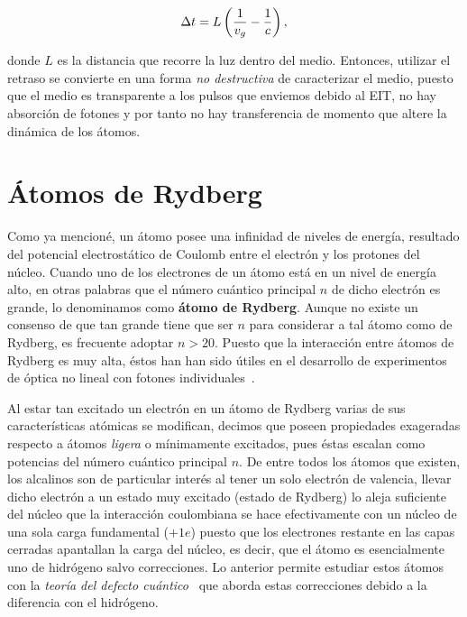 \begin{equation}
\label{ec:retraso}
\Delta t=L\left(\dfrac{1}{v_{g}}-\dfrac{1}{c}\right),
\end{equation}

donde $L$ es la distancia que recorre la luz dentro del medio. Entonces, utilizar el retraso se convierte en una forma \emph{no destructiva} de caracterizar el medio, puesto que el medio es transparente a los pulsos que enviemos debido al EIT, no hay absorción de fotones y por tanto no hay transferencia de momento que altere la dinámica de los átomos.

\section{\label{sec:atomosRydberg}Átomos de Rydberg}

Como ya mencioné, un átomo posee una infinidad de niveles de energía, resultado del potencial electrostático de Coulomb entre el electrón y los protones del núcleo. Cuando uno de los electrones de un átomo está en un nivel de energía alto, en otras palabras que el número cuántico principal $n$ de dicho electrón es grande, lo denominamos como \textbf{átomo de Rydberg}. Aunque no existe un consenso de que tan grande tiene que ser $n$ para considerar a tal átomo como de Rydberg, es frecuente adoptar $n>20$. Puesto que la interacción entre átomos de Rydberg es muy alta, éstos han han sido útiles en el desarrollo de experimentos de óptica no lineal con fotones individuales~\cite{peyronel,gorniaczyk,chang}.

\p Al estar tan excitado un electrón en un átomo de Rydberg varias de sus características atómicas se modifican, decimos que poseen propiedades exageradas respecto a átomos \emph{ligera} o mínimamente excitados, pues éstas escalan como potencias del número cuántico principal $n$. De entre todos los átomos que existen, los alcalinos son de particular interés al tener un solo electrón de valencia, llevar dicho electrón a un estado muy excitado (estado de Rydberg) lo aleja suficiente del núcleo que la interacción coulombiana se hace efectivamente con un núcleo de una sola carga fundamental ($+1e$) puesto que los electrones restante en las capas cerradas apantallan la carga del núcleo, es decir, que el átomo es esencialmente uno de hidrógeno salvo correcciones. Lo anterior permite estudiar estos átomos con la \emph{teoría del defecto cuántico}~\cite{gallagher,seaton} que aborda estas correcciones debido a la diferencia con el hidrógeno.

